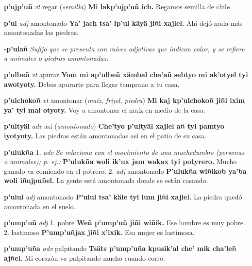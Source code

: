 \documentclass[10pt]{scrbook}
\newcommand{\entry}[1]{\textbf{#1}}
\newcommand{\onedefinition}[1]{#1.}
\newcommand{\nontranslationdef}[1]{\textit{#1}}
\newcommand{\partofspeech}[1]{\textit{#1}}
\newcommand{\spanishtranslation}[1]{#1}
\newcommand{\clarification}[1]{(\textit{#1})}
\newcommand{\cholexample}[1]{\textbf{#1}}
\newcommand{\exampletranslation}[1]{#1}
\begin{document}
\begin{multicols}{2}
\entry{p'ujp'uñ}
\partofspeech{vt}
\spanishtranslation{regar}
\clarification{semilla}
\cholexample{Mi lakp'ujp'uñ ich.}
\exampletranslation{Regamos semilla de chile.}

\entry{p'ul}
\partofspeech{adj}
\spanishtranslation{amontonado}
\cholexample{Ya' jach tsa' ip'ul käyä jiñi xajlel.}
\exampletranslation{Ahí dejó nada más amontonadas las piedras.}

\entry{-p'ulañ}
\nontranslationdef{Sufijo que se presenta con raíces adjetivas que indican color, y se refiere a animales o piedras amontonadas.}

\entry{p'ulbeñ}
\partofspeech{vt}
\spanishtranslation{apurar}
\cholexample{Yom mi ap'ulbeñ xämbal cha'añ sebtyo mi ak'otyel tyi awotyoty.}
\exampletranslation{Debes apurarte para llegar temprano a tu casa.}

\entry{p'ulchokoñ}
\partofspeech{vt}
\spanishtranslation{amontonar}
\clarification{maíz, frijol, piedra}
\cholexample{Mi kaj kp'ulchokoñ jiñi ixim ya' tyi mal otyoty.}
\exampletranslation{Voy a amontonar el maíz en medio de la casa.}

\entry{p'ultyäl}
\partofspeech{adv}
\spanishtranslation{así}
\clarification{amontonado}
\cholexample{Che'tyo p'ultyäl xajlel añ tyi pamtyo iyotyoty.}
\exampletranslation{Las piedras están amontonadas así en el patio de su casa.}

\entry{p'ulukña}
\onedefinition{1}
\partofspeech{adv}
\nontranslationdef{Se relaciona con el movimiento de una muchedumbre (personas o animales); p. ej.:}
\cholexample{P'ulukña woli ik'ux jam wakax tyi potyrero.}
\exampletranslation{Mucho ganado va comiendo en el potrero.}
\onedefinition{2}
\partofspeech{adj}
\spanishtranslation{amontonado}
\cholexample{P'ulukña wiñikob ya'ba woli iñujpuñel.}
\exampletranslation{La gente está amontonada donde se están casando.}

\entry{p'ulul}
\partofspeech{adj}
\spanishtranslation{amontonado}
\cholexample{P'ulul tsa' käle tyi lum jiñi xajlel.}
\exampletranslation{La piedra quedó amontonada en el suelo.}

\entry{p'ump'uñ}
\partofspeech{adj}
\onedefinition{1}
\spanishtranslation{pobre}
\cholexample{Weñ p'ump'uñ jiñi wiñik.}
\exampletranslation{Ese hombre es muy pobre.}
\onedefinition{2}
\spanishtranslation{lastimoso}
\cholexample{P'ump'uñjax jiñi x'ixik.}
\exampletranslation{Esa mujer es lastimosa.}

\entry{p'ump'uña}
\partofspeech{adv}
\spanishtranslation{palpitando}
\cholexample{Tsäts p'ump'uña kpusik'al che' mik cha'leñ ajñel.}
\exampletranslation{Mi corazón va palpitando mucho cuando corro.}


\end{multicols}
\end{document}
